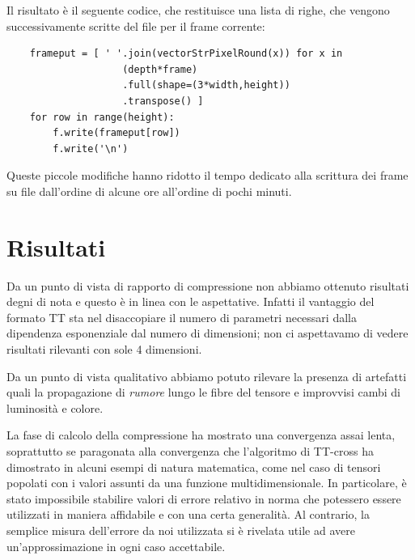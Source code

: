 \documentclass[11pt,a4paper]{article}
\begin{document}
Il risultato è il seguente codice, che restituisce una lista di righe, che vengono successivamente scritte del file per il frame corrente:
\begin{lstlisting}
    frameput = [ ' '.join(vectorStrPixelRound(x)) for x in 
                    (depth*frame)
                    .full(shape=(3*width,height))
                    .transpose() ]
    for row in range(height):
        f.write(frameput[row])
        f.write('\n')
\end{lstlisting}

Queste piccole modifiche hanno ridotto il tempo dedicato alla scrittura dei frame su file dall'ordine di alcune ore all'ordine di pochi minuti.




\section{Risultati}
Da un punto di vista di rapporto di compressione non abbiamo ottenuto risultati degni di nota e questo è in linea con le aspettative.  Infatti il vantaggio del formato TT sta nel disaccopiare il numero di parametri necessari dalla dipendenza esponenziale dal numero di dimensioni; non ci aspettavamo di vedere risultati rilevanti con sole 4 dimensioni.

Da un punto di vista qualitativo abbiamo potuto rilevare la presenza di artefatti quali la propagazione di \emph{rumore} lungo le fibre del tensore e improvvisi cambi di luminosità e colore.

La fase di calcolo della compressione ha mostrato una convergenza assai lenta, soprattutto se paragonata alla convergenza che l'algoritmo di TT-cross ha dimostrato in alcuni esempi di natura matematica, come nel caso di tensori popolati con i valori assunti da una funzione multidimensionale.  In particolare, è stato impossibile stabilire valori di errore relativo in norma che potessero essere utilizzati in maniera affidabile e con una certa generalità. Al contrario, la semplice misura dell'errore da noi utilizzata si è rivelata utile ad avere un'approssimazione in ogni caso accettabile.
\end{document}
